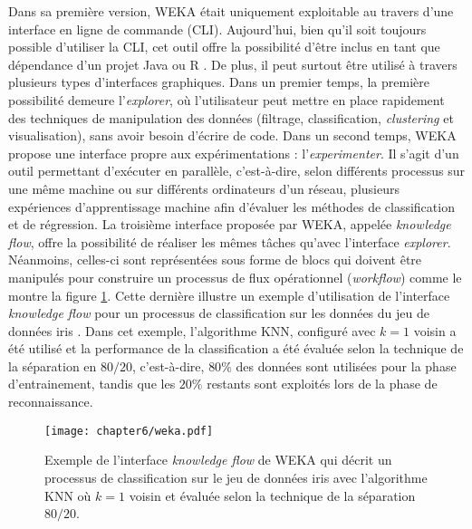 Dans sa première version, \acs{WEKA} était uniquement exploitable au travers d'une interface en ligne de commande (\acs{CLI}). Aujourd'hui, bien qu'il soit toujours possible d'utiliser la \acs{CLI}, cet outil offre la possibilité d'être inclus en tant que dépendance d'un projet Java ou \textsf{R} \citep{Hornik2009}. De plus, il peut surtout être utilisé à travers plusieurs types d'interfaces graphiques. Dans un premier temps, la première possibilité demeure l'\emph{explorer}, où l'utilisateur peut mettre en place rapidement des techniques de manipulation des données (filtrage, classification, \textit{clustering} et visualisation), sans avoir besoin d'écrire de code. Dans un second temps, \acs{WEKA} propose une interface propre aux expérimentations : l'\emph{experimenter}. Il s'agit d'un outil permettant d'exécuter en parallèle, c'est-à-dire, selon différents processus sur une même machine ou sur différents ordinateurs d'un réseau, plusieurs expériences d'apprentissage machine afin d'évaluer les méthodes de classification et de régression. La troisième interface proposée par \acs{WEKA}, appelée \emph{knowledge flow}, offre la possibilité de réaliser les mêmes tâches qu'avec l'interface \emph{explorer}. Néanmoins, celles-ci sont représentées sous forme de blocs qui doivent être manipulés pour construire un processus de flux opérationnel (\textit{workflow}) comme le montre la figure \ref{fig:weka}. Cette dernière illustre un exemple d'utilisation de l'interface \emph{knowledge flow} pour un processus de classification sur les données du jeu de données iris \citep{Asuncion2007}. Dans cet exemple, l'algorithme \acs{KNN}, configuré avec $k=1$ voisin a été utilisé et la performance de la classification a été évaluée selon la technique de la séparation en $80/20$, c'est-à-dire, $80\%$ des données sont utilisées pour la phase d'entrainement, tandis que les $20\%$ restants sont exploités lors de la phase de reconnaissance.

\begin{figure}[H]
	\centering
	\texttt{[image: chapter6/weka.pdf]}
        \caption{Exemple de l'interface \textit{knowledge flow} de \acs{WEKA} qui décrit un processus de classification sur le jeu de données iris avec l'algorithme \acs{KNN} où $k=1$ voisin et évaluée selon la technique de la séparation $80/20$.}
	\label{fig:weka}
\end{figure}

